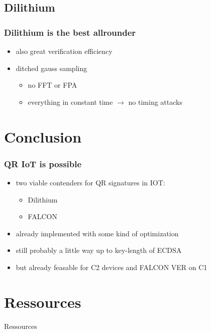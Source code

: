 \documentclass[ucs,10pt]{beamer}
\begin{document}
\subsection{Dilithium}
\begin{frame}
  \frametitle{Dilithium is the best allrounder}

  \begin{itemize}
    \item also great verification efficiency 
    \item ditched gauss sampling
    \begin{itemize}
      \item no FFT or FPA 
      \item everything in constant time $\rightarrow$ no timing attacks
    \end{itemize}
  \end{itemize}

\end{frame}

\section{Conclusion}
\begin{frame}
  \frametitle{QR IoT is possible}
  \begin{itemize}
    \item two viable contenders for QR signatures in IOT:
    \begin{itemize}
      \item Dilithium
      \item FALCON
    \end{itemize}
    \item already implemented with some kind of optimization
    \item still probably a little way up to key-length of ECDSA
    \item but already feasable for C2 devices and FALCON VER on C1
  \end{itemize}
  

\end{frame}

\section{Ressources}
\begin{frame}[allowframebreaks]{Ressources}
  \nocite{*}
  
  
\end{frame}
\end{document}
